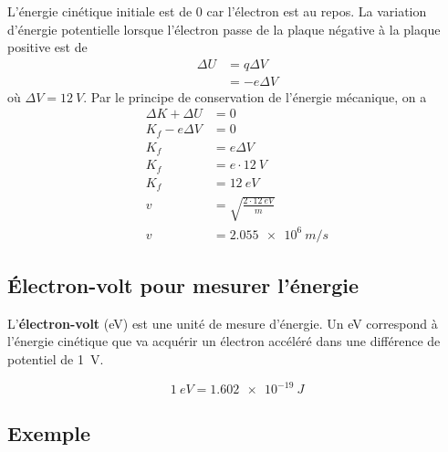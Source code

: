 \begin{center}
\end{center}

L'énergie cinétique initiale est de $0$ car l'électron est au repos. La
variation d'énergie potentielle lorsque l'électron passe de la plaque négative
à la plaque positive est de
\begin{align*}
  \Delta U &= q \Delta V \\
           &= -e \Delta V
\end{align*}
où $\Delta V = \SI{12}{V}$. Par le principe de conservation de l'énergie
mécanique, on a
\begin{align*}
  \Delta K + \Delta U &= 0  \\
      K_f - e\Delta V &= 0  \\
      K_f &= e\Delta V     \\
      K_f &= e \cdot \SI{12}{V}  \\
      K_f &= \SI{12}{eV}   \\
        v &= \sqrt{\frac{2 \cdot \SI{12}{eV}}{m}}  \\
        v &= \SI{2.055e6}{m/s}
\end{align*}


\subsection*{Électron-volt pour mesurer l'énergie}


L'\textbf{électron-volt} (\si{eV}) est une unité de mesure d'énergie. Un
\si{eV} correspond à l'énergie cinétique que va acquérir un électron accéléré
dans une différence de potentiel de \SI{1}{V}.

\[
    \SI{1}{eV} = \SI{1.602e-19}{J}
\]


\subsection*{Exemple}



